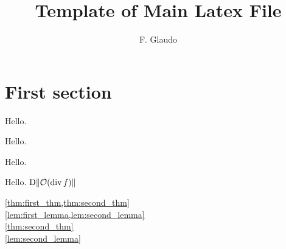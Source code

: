\documentclass[reqno,11pt,final]{amsart}
\title[Latex Template]{Template of Main Latex File}
\author{F. Glaudo}
\begin{document}
 
\maketitle
\tableofcontents

\section{First section}
\begin{theorem}\label{thm:first_thm}
    Hello.
\end{theorem}
\begin{theorem}\label{thm:second_thm}
    Hello.
\end{theorem}
\begin{lemma}\label{lem:first_lemma}
    Hello.
\end{lemma}
\begin{lemma}\label{lem:second_lemma}
    Hello. $\diff\norm{\bigo(\div f)}$
\end{lemma}
\cref{thm:first_thm,thm:second_thm}\\
\cref{lem:first_lemma,lem:second_lemma}\\
\cref{thm:second_thm}\\
\cref{lem:second_lemma}

\end{document}
